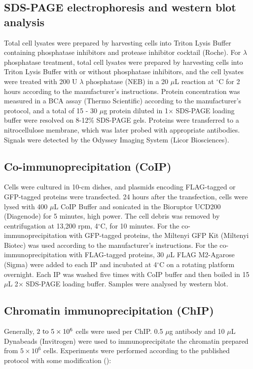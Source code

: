 \subsection{SDS-PAGE electrophoresis and western blot analysis}

Total cell lysates were prepared by harvesting cells into Triton Lysis Buffer containing phosphatase inhibitors and protease inhibitor cocktail (Roche). For $\lambda$ phosphatase treatment, total cell lysates were prepared by harvesting cells into Triton Lysis Buffer with or without phosphatase inhibitors, and the cell lysates were treated with 200 U $\lambda$ phosphatase (NEB) in a 20 $\mu$L reaction at $^\circ$C for 2 hours according to the manufacturer's instructions. Protein concentration was measured in a BCA assay (Thermo Scientific) according to the manufacturer's protocol, and a total of 15 - 30 $\mu$g protein diluted in 1$\times$ SDS-PAGE loading buffer were resolved on 8-12\% SDS-PAGE gels. Proteins were transferred to a nitrocellulose membrane, which was later probed with appropriate antibodies. Signals were detected by the Odyssey Imaging System (Licor Biosciences).

\subsection{Co-immunoprecipitation (CoIP)}

Cells were cultured in 10-cm dishes, and plasmids encoding FLAG-tagged or GFP-tagged proteins were transfected. 24 hours after the transfection, cells were lysed with 400 $\mu$L CoIP Buffer and sonicated in the Bioruptor UCD200 (Diagenode) for 5 minutes, high power. The cell debris was removed by centrifugation at 13,200 rpm, 4$^\circ$C, for 10 minutes. For the co-immunoprecipitation with GFP-tagged proteins, the Miltenyi GFP Kit (Miltenyi Biotec) was used according to the manufacturer’s instructions. For the co- immunoprecipitation with FLAG-tagged proteins, 30 $\mu$L FLAG M2-Agarose (Sigma) were added to each IP and incubated at 4$^\circ$C on a rotating platform overnight. Each IP was washed five times with CoIP buffer and then boiled in 15 $\mu$L 2$\times$ SDS-PAGE loading buffer. Samples were analysed by western blot.

\subsection{Chromatin immunoprecipitation (ChIP)} \label{chipmethod}

Generally, $2 \textmd{ to } 5 \times 10^6$ cells were used per ChIP. 0.5 $\mu$g antibody and 10 $\mu$L Dynabeads (Invitrogen) were used to immunoprecipitate the chromatin prepared from $5 \times 10^6$ cells. Experiments were performed according to the published protocol with some modification (\cite{lee2006chromatin}):

